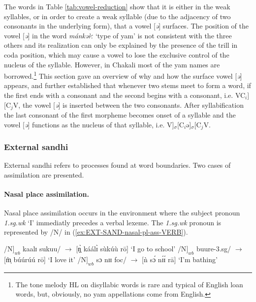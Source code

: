 The words in Table \ref{tab:vowel-reduction} show  that it is either in the weak
syllables, or in order to create
a weak syllable (due to the adjacency of two consonants in the underlying form),
 that a vowel [\textit{ə}] surfaces. The position of the vowel [\textit{ə}] in 
the word {\it 
mánkər̀ː} `type of yam'  is not consistent with the three others and 
  its realization can only be explained by the presence of the trill in coda
position,
which may cause a vowel to lose the exclusive control of the nucleus of the
syllable. However, in Chakali most of the yam names are
borrowed.\footnote{The tone melody HL on disyllabic words is rare and
typical
of English loan words,  but, obviously, no yam appellations come from English.}
This section gave an overview of why and how the surface vowel [\textit{ə}] 
appears, and
further established that whenever two stems meet to form a word, if the first 
ends with a consonant and the second begins with a consonant, i.e.
VC$_{i}$][C$_{j}$V, the vowel [\textit{ə}] is inserted between the two 
consonants. 
After
syllabification the last consonant of the first morpheme becomes onset of a
syllable and the vowel [\textit{ə}] functions as the nucleus of that syllable, 
i.e.
V]$_{\sigma}$[C$_{i}$ə]$_{\sigma}$[C$_{j}$V. 






\subsubsection{External sandhi}
External sandhi refers to processes found at word boundaries.  Two cases
of  assimilation are presented.

\paragraph{Nasal place assimilation.}
\label{sec:ext-nasal-place}

Nasal place assimilation occurs in the environment where the subject pronoun
 {\it 1.sg.wk} `I'  immediatly precedes a verbal lexeme.  The  {\it 1.sg.wk} 
pronoun is represented by  /N/
in
(\ref{ex:EXT-SAND-nasal-pl-ass-VERB}).

\begin{exe}
\ex\label{ex:EXT-SAND-nasal-pl-ass-VERB} 
\begin{xlist}
 \ex\label{ex:EXT-SAND-N} 
/N$]_{wb}$ kaalɪ sukuu/ $\rightarrow$ [ŋ̩̀ káálɪ̀ sùkúù rō] {\rm `I go to 
school'}
 \ex\label{ex:EXT-SAND-m} 
/N$]_{wb}$ buure-{\sc 3.sg}/   $\rightarrow$  [m̩̀ búúrúú rō] {\rm `I love 
it'}
 \ex\label{ex:EXT-SAND-n} 
/N$]_{wb}$ sɔ nɪɪ {\sc foc}/   $\rightarrow$  [ǹ sɔ́  nɪ́ɪ́ rā] {\rm  `I'm 
bathing'}
\end{xlist}
\end{exe}

